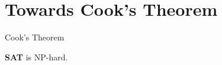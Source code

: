 \documentclass[11pt,usenames,dvipsnames,
  hyperref={pdfencoding=auto,psdextra}]{beamer}
\begin{document}
\section{Towards Cook's Theorem}
\begin{frame}{Cook's Theorem}
  \begin{block}{\vspace*{-3ex}}
    \textbf{SAT} is NP-hard.
  \end{block}


\end{frame}
\end{document}
